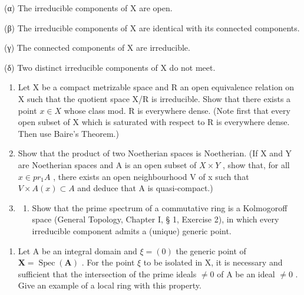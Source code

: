 (α) The irreducible components of X are open.

(β) The irreducible components of X are identical with its connected components.

(γ) The connected components of X are irreducible.

(δ) Two distinct irreducible components of X do not meet.

\begin{enumerate}
\def\labelenumi{\arabic{enumi}.}
\setcounter{enumi}{6}
\item
  Let X be a compact metrizable space and R an open equivalence relation on X such that the quotient space X/R is irreducible. Show that there exists a point \(x \in X\) whose class mod. R is everywhere dense. (Note first that every open subset of X which is saturated with respect to R is everywhere dense. Then use Baire's Theorem.)
\item
  Show that the product of two Noetherian spaces is Noetherian. (If X and Y are Noetherian spaces and A is an open subset of \(X \times Y\) , show that, for all \(x \in pr_{1}A\) , there exists an open neighbourhood V of x such that \(V \times A(x) \subset A\) and deduce that A is quasi-compact.)
\item
  \begin{enumerate}
  \def\labelenumii{(\alph{enumii})}
  \tightlist
  \item
    Show that the prime spectrum of a commutative ring is a Kolmogoroff space (General Topology, Chapter I, § 1, Exercise 2), in which every irreducible component admits a (unique) generic point.
  \end{enumerate}
\end{enumerate}

\begin{enumerate}
\def\labelenumi{(\alph{enumi})}
\setcounter{enumi}{1}
\tightlist
\item
  Let A be an integral domain and \(\xi = (0)\) the generic point of \(\mathbf{X} = \operatorname{Spec}(\mathbf{A})\) . For the point \(\xi\) to be isolated in X, it is necessary and sufficient that the intersection of the prime ideals \(\neq 0\) of A be an ideal \(\neq 0\) . Give an example of a local ring with this property.
\end{enumerate}

